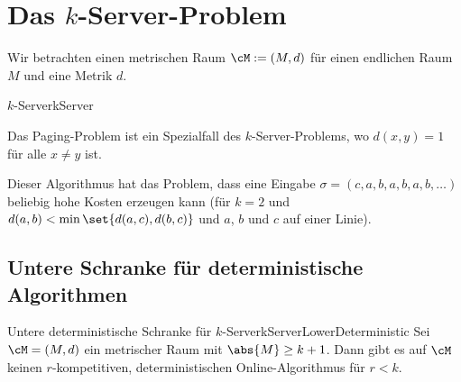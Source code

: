 \documentclass[language=ngerman,algolist]{TemplateLecture}
\begin{document}
\chapter{Das $k$-Server-Problem}

Wir betrachten einen metrischen Raum $\cM := (M, d)$ für einen endlichen Raum $M$ und eine Metrik $d$.
\begin{prob}{$k$-Server}{kServer}
\end{prob}

Das Paging-Problem ist ein Spezialfall des $k$-Server-Problems, wo $d(x,y) = 1$ für alle $x \neq y$ ist.

\begin{algorithm}[h]
    \caption{\textsc{Greedy-KServ}}\label{alg:greedy-kserv}
    \begin{algorithmic}[1]
            \EndIf{}
        \EndFor{}
    \end{algorithmic}
\end{algorithm}

Dieser Algorithmus hat das Problem, dass eine Eingabe $\sigma = (c, a, b, a, b, a, b, \ldots)$ beliebig hohe Kosten erzeugen kann (für $k = 2$ und $d(a,b) < \min\set{d(a,c), d(b,c)}$ und $a$, $b$ und $c$ auf einer Linie).

\section{Untere Schranke für deterministische Algorithmen}

\begin{thm}{Untere deterministische Schranke für $k$-Server}{kServerLowerDeterministic}
    Sei $\cM = (M, d)$ ein metrischer Raum mit $\abs{M} \geq k + 1$. Dann gibt es auf $\cM$ keinen $r$-kompetitiven, deterministischen Online-Algorithmus für $r < k$.
\end{thm}
\end{document}
